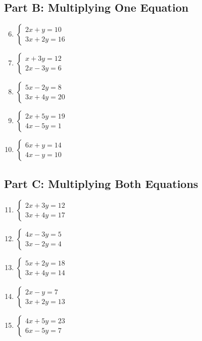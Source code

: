 \documentclass[12pt]{article}
\begin{document}
\subsection*{Part B: Multiplying One Equation}
\begin{enumerate}
    \setcounter{enumi}{5}
    \item \(\begin{cases} 2x + y = 10 \\ 3x + 2y = 16 \end{cases}\)
    \item \(\begin{cases} x + 3y = 12 \\ 2x - 3y = 6 \end{cases}\)
    \item \(\begin{cases} 5x - 2y = 8 \\ 3x + 4y = 20 \end{cases}\)
    \item \(\begin{cases} 2x + 5y = 19 \\ 4x - 5y = 1 \end{cases}\)
    \item \(\begin{cases} 6x + y = 14 \\ 4x - y = 10 \end{cases}\)
\end{enumerate}

\subsection*{Part C: Multiplying Both Equations}
\begin{enumerate}
    \setcounter{enumi}{10}
    \item \(\begin{cases} 2x + 3y = 12 \\ 3x + 4y = 17 \end{cases}\)
    \item \(\begin{cases} 4x - 3y = 5 \\ 3x - 2y = 4 \end{cases}\)
    \item \(\begin{cases} 5x + 2y = 18 \\ 3x + 4y = 14 \end{cases}\)
    \item \(\begin{cases} 2x - y = 7 \\ 3x + 2y = 13 \end{cases}\)
    \item \(\begin{cases} 4x + 5y = 23 \\ 6x - 5y = 7 \end{cases}\)
\end{enumerate}
\end{document}
